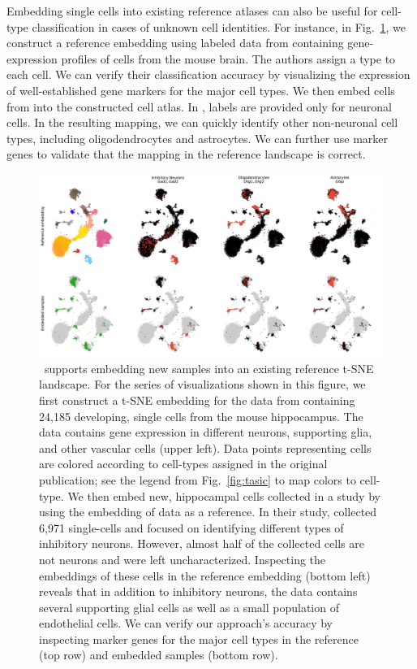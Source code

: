 \documentclass[article]{jss}
\newcommand{\opentsne}{\pkg{openTSNE}}
\begin{document}
Embedding single cells into existing reference atlases can also be useful for
cell-type classification in cases of unknown cell identities. For instance, in
Fig.~\ref{fig:transform}, we construct a reference embedding using labeled data
from \citet{hochgerner2018conserved} containing gene-expression profiles of
cells from the mouse brain. The authors assign a type to each cell. We can
verify their classification accuracy by visualizing the expression of
well-established gene markers for the major cell types. We then embed cells
from \citet{harris2018classes} into the constructed cell atlas. In
\citet{harris2018classes}, labels are provided only for neuronal cells. In the
resulting mapping, we can quickly identify other non-neuronal cell types,
including oligodendrocytes and astrocytes. We can further use marker genes to
validate that the mapping in the reference landscape is correct. 

\begin{figure}[htbp]
  \includegraphics[width=\textwidth]{transform_hochgerner}
  \caption{\label{fig:transform}
  \opentsne\ supports embedding new samples into an existing reference t-SNE
  landscape. For the series of visualizations shown in this figure, we
  first construct a t-SNE embedding for the data from 
  \citet{hochgerner2018conserved} containing 24,185
  developing, single cells from the mouse hippocampus. The data contains
  gene expression in different neurons, supporting glia, and other
  vascular cells (upper left). Data points representing cells are colored
  according to cell-types assigned in the original publication; see the
  legend from Fig.~\ref{fig:tasic} to map colors to cell-type. We then
  embed new, hippocampal cells collected in a study by
  \citet{harris2018classes} using the embedding of \citet{hochgerner2018conserved}
  data as a reference. In their study, \citet{harris2018classes}
  collected 6,971 single-cells and focused on identifying different
  types of inhibitory neurons. However, almost half of the collected cells
  are not neurons and were left uncharacterized. Inspecting the embeddings
  of these cells in the reference embedding (bottom left) reveals that in
  addition to inhibitory neurons, the data contains several supporting
  glial cells as well as a small population of endothelial cells. We can
  verify our approach's accuracy by inspecting marker genes for the major
  cell types in the reference (top row) and embedded samples (bottom row).
}
\end{figure}
\end{document}
